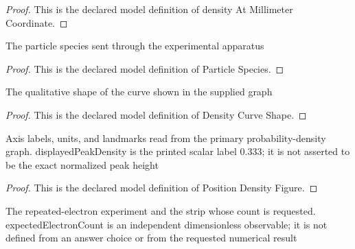 \begin{proof}
  This is the declared model definition of density At Millimeter Coordinate.
\end{proof}
\begin{definition}
  \label{def:physics:phyx-mini-0645:phyxminiproblems-problemphyxmini0645-particlespecies}
  The particle species sent through the experimental apparatus
\end{definition}
\begin{proof}
  This is the declared model definition of Particle Species.
\end{proof}
\begin{definition}
  \label{def:physics:phyx-mini-0645:phyxminiproblems-problemphyxmini0645-densitycurveshape}
  The qualitative shape of the curve shown in the supplied graph
\end{definition}
\begin{proof}
  This is the declared model definition of Density Curve Shape.
\end{proof}
\begin{definition}
  \label{def:physics:phyx-mini-0645:phyxminiproblems-problemphyxmini0645-positiondensityfigure}
  Axis labels, units, and landmarks read from the primary probability-density graph. displayedPeakDensity is the printed scalar label 0.333; it is not asserted to be the exact normalized peak height
\end{definition}
\begin{proof}
  This is the declared model definition of Position Density Figure.
\end{proof}
\begin{definition}
  \label{def:physics:phyx-mini-0645:phyxminiproblems-problemphyxmini0645-electronstripexperiment}
  The repeated-electron experiment and the strip whose count is requested. expectedElectronCount is an independent dimensionless observable; it is not defined from an answer choice or from the requested numerical result
\end{definition}
